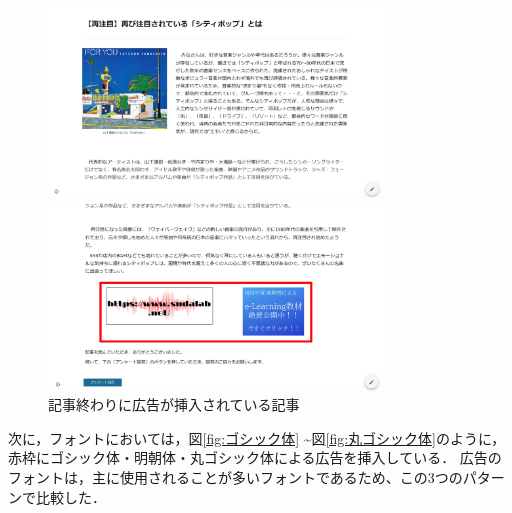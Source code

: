 \documentclass[12pt,a4j,titlepage]{ltjsarticle}
\begin{document}
\begin{figure}[H]
  \begin{minipage}[b]{0.50\linewidth}
    \centering
    \includegraphics[height=50mm]{figures/記事終わり_1.pdf}
  \end{minipage}
  \begin{minipage}[b]{0.50\linewidth}
    \centering
    \includegraphics[height=50mm]{figures/記事終わり_2.pdf}
  \end{minipage}
   \caption{記事終わりに広告が挿入されている記事}
    \label{fig:記事終わり}
\end{figure}

次に，フォントにおいては，図\ref{fig:ゴシック体} \textasciitilde 図\ref{fig:丸ゴシック体}のように，赤枠にゴシック体・明朝体・丸ゴシック体による広告を挿入している．
広告のフォントは，主に使用されることが多いフォントであるため、この3つのパターンで比較した．
\end{document}
